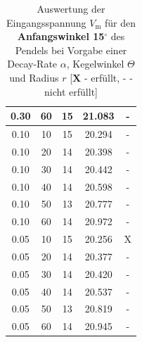 \begin{table}[H]
\begin{tabular}{|c|c|c|c|c|}
        0.30 & 60 & 15 & 21.083 & -\\
        \hline
        0.10 & 10 & 15 & 20.294 & -\\
        0.10 & 20 & 14 & 20.398 & -\\
        0.10 & 30 & 14 & 20.442 & -\\
        0.10 & 40 & 14 & 20.598 & -\\
        0.10 & 50 & 13 & 20.777 & -\\
        0.10 & 60 & 14 & 20.972 & -\\
        \hline
        0.05 & 10 & 15 & 20.256 & X\\
        0.05 & 20 & 14 & 20.377 & -\\
        0.05 & 30 & 14 & 20.420 & -\\
        0.05 & 40 & 14 & 20.537 & -\\
        0.05 & 50 & 13 & 20.819 & -\\
        0.05 & 60 & 14 & 20.945 & -\\
        \hline
    \end{tabular}
    \caption[Auswertung von $V_{\mathrm{m}}$ bei einem Anfangswinkel von 15${^\circ}$]{Auswertung der Eingangsspannung $V_{\mathrm{m}}$ für den \textbf{Anfangswinkel 15${^\circ}$} des Pendels bei Vorgabe einer Decay-Rate $\alpha$, Kegelwinkel $\Theta$ und Radius $r$ [$\textbf{X}$ - erfüllt, $\textbf{-}$ - nicht erfüllt]}
    \label{tab:Tabelle7.2}
\end{table}

